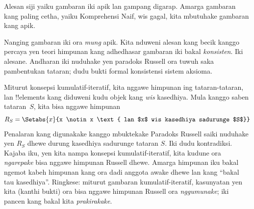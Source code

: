 \documentclass[../../../include/open-logic-section]{subfiles}
\begin{document}
Alesan siji yaiku gambaran iki apik lan gampang digarap.
Amarga gambaran kang paling cetha, yaiku Komprehensi Naif,
wis gagal, kita mbutuhake gambaran kang apik.

Nanging gambaran iki ora \emph{mung} apik. Kita nduweni
alesan kang becik kanggo percaya yen teori himpunan kang
adhedhasar gambaran iki bakal \emph{konsisten}. Iki alesane.
Andharan iki nuduhake yen paradoks Russell ora tuwuh saka pambentukan tataran; dudu bukti formal konsistensi sistem aksioma.

Miturut konsepsi kumulatif-iteratif, kita nggawe himpunan
ing tataran-tataran, lan !!{element}s kang diduweni kudu objek kang
\emph{wis} kasedhiya. Mula kanggo saben tataran~$S$,
kita bisa nggawe himpunan
\[
	R_S = \Setabs{x}{x \notin x \text{ lan $x$ wis kasedhiya sadurunge $S$}}
\]
Penalaran kang digunakake kanggo mbuktekake Paradoks Russell
saiki nuduhake yen $R_S$ dhewe durung kasedhiya sadurunge
tataran $S$. Iki dudu kontradiksi. Kajaba iku, yen kita
nampa konsepsi kumulatif-iteratif, kita kudune ora
\emph{ngarepake} bisa nggawe himpunan Russell dhewe. Amarga
himpunan iku bakal ngemot kabeh himpunan kang ora dadi
anggota awake dhewe lan kang ``bakal tau kasedhiya''.
Ringkese: miturut gambaran kumulatif-iteratif, kasunyatan
yen kita (kanthi bukti) ora bisa nggawe himpunan Russell
ora \emph{nggumunake}; iki pancen kang bakal kita
\emph{prakirakake}.

%

\end{document}
